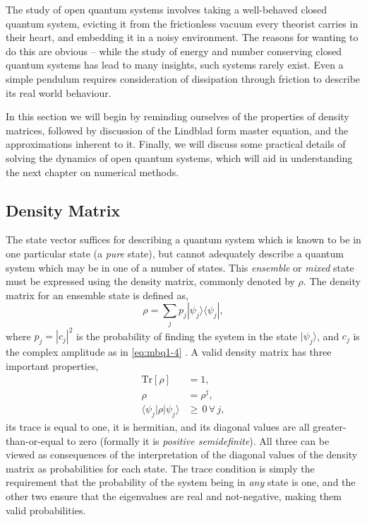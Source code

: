 The study of open quantum systems involves taking a well-behaved closed quantum system, evicting it from the frictionless vacuum every theorist carries in their heart, and embedding it in a noisy environment. The reasons for wanting to do this are obvious -- while the study of energy and number conserving closed quantum systems has lead to many insights, such systems rarely exist. Even a simple pendulum requires consideration of dissipation through friction to describe its real world behaviour.  

In this section we will begin by reminding ourselves of the properties of density matrices, followed by discussion of the Lindblad form master equation, and the approximations inherent to it. Finally, we will discuss some practical details of solving the dynamics of open quantum systems, which will aid in understanding the next chapter on numerical methods.

\subsection{Density Matrix}
The state vector suffices for describing a quantum system which is known to be in one particular state (a \emph{pure} state), but cannot adequately describe a quantum system which may be in one of a number of states. This \emph{ensemble} or \emph{mixed} state must be expressed using the density matrix, commonly denoted by \(\rho\). The density matrix for an ensemble state is defined as,
\begin{equation}
	\rho = \sum_{j} p_{j} |\psi_{j} \rangle \langle \psi_{j}|,
	\label{eq:oqs2-1}
\end{equation}
where \(p_{j} = |c_{j}|^{2}\) is the probability of finding the system in the state \(|\psi_{j}\rangle\), and \(c_{j}\) is the complex amplitude as in \cref{eq:mbq1-4} \cite{NielsenChuang_DM}. A valid density matrix has three important properties,
\begin{align}
	\mathrm{Tr}[\rho] &= 1, \label{eq:oqs2-2} \\
	\rho &= \rho^{\dagger}, \label{eq:oqs2-3} \\
	\langle \psi_{j}| \rho | \psi_{j} \rangle &\geq \, 0 \, \forall \, j, \label{eq:oqs2-4}
\end{align}
its trace is equal to one, it is hermitian, and its diagonal values are all greater-than-or-equal to zero (formally it is \emph{positive semidefinite}). All three can be viewed as consequences of the interpretation of the diagonal values of the density matrix as probabilities for each state. The trace condition is simply the requirement that the probability of the system being in \emph{any} state is one, and the other two ensure that the eigenvalues are real and not-negative, making them valid probabilities.

